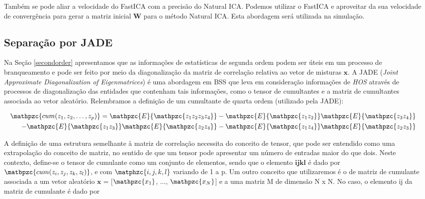         Também se pode aliar a velocidade do FastICA com a precisão do Natural ICA. Podemos utilizar o FastICA e aproveitar da sua velocidade de convergência para gerar a matriz inicial $\mathbf{W}$ para o método Natural ICA. Esta abordagem será utilizada na simulação.
        
    \subsection{Separação por JADE}
        Na Seção \ref{secondorder} apresentamos que as informações de estatísticas de segunda ordem podem ser úteis em um processo de branqueamento e pode ser feito por meio da diagonalização da matriz de correlação relativa ao vetor de misturas $\mathbf{x}$. A JADE (\textit{Joint Approximate Diagonalization of Eigenmatrices})\cite{JADE} é uma abordagem em BSS que leva em consideração informações de \textit{HOS} através de processos de diagonalização das entidades que contenham tais informações, como o tensor de cumultantes e a matriz de cumultantes associada ao vetor aleatório. Relembramos a definição de um cumultante de quarta ordem (utilizado pela JADE):
    
    \begin{equation}
        \label{cumJADE}
        \begin{split}
        \mathpzc{cum(z_1,z_2,\dots,z_p)} = \mathpzc{E}\{\mathpzc{z_1z_2z_3z_4}\} - \mathpzc{E}\{\mathpzc{z_1z_2}\}\mathpzc{E}\{\mathpzc{z_3z_4}\} & \\ - \mathpzc{E}\{\mathpzc{z_1z_3}\}\mathpzc{E}\{\mathpzc{z_2z_4}\} - \mathpzc{E}\{\mathpzc{z_1z_4}\}\mathpzc{E}\{\mathpzc{z_2z_3}\}    
        \end{split}
    \end{equation}
    
    A definição de uma estrutura semelhante à matriz de correlação necessita do conceito de tensor, que pode ser entendido como uma extrapolação do conceito de matriz, no sentido de que um tensor pode apresentar um número de  entradas maior do que dois. Neste contexto, define-se o tensor de cumulante como um conjunto de elementos, sendo que o elemento $\mathbf{ijkl}$ é dado por $\matbpzc{cum(z_i, z_j, z_k, z_l)}$, e com $\matphzc{i,j,k,l}$ variando de 1 a p.
    Um outro conceito que utilizaremos é o de matriz de cumulante associada a um vetor aleatório $\mathbf{x}$ = [$\mathpzc{x_1}$, $\dots$,  $\mathpzc{x_N}$] e a uma matriz M de dimensão N x N. No caso, o elemento ij da matriz de cumulante é dado por
    
